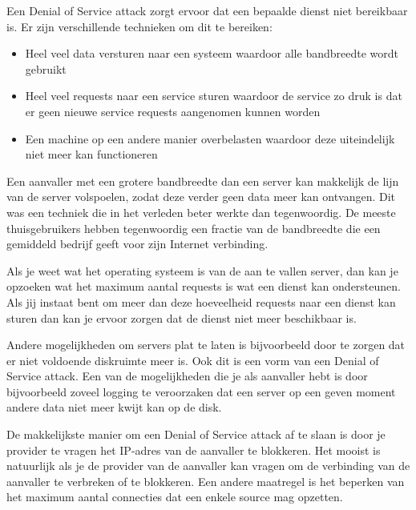 Een Denial of Service attack zorgt ervoor dat een bepaalde dienst niet bereikbaar is. Er zijn verschillende technieken om dit te bereiken:
\begin{itemize}
\item Heel veel data versturen naar een systeem waardoor alle bandbreedte wordt gebruikt
\item Heel veel requests naar een service sturen waardoor de service zo druk is dat er geen nieuwe service requests aangenomen kunnen worden
\item Een machine op een andere manier overbelasten waardoor deze uiteindelijk niet meer kan functioneren
\end{itemize}

Een aanvaller met een grotere bandbreedte dan een server kan makkelijk de lijn van de server volspoelen, zodat deze verder geen data meer kan ontvangen. Dit was een techniek die in het verleden beter werkte dan tegenwoordig. De meeste thuisgebruikers hebben tegenwoordig een fractie van de bandbreedte die een gemiddeld bedrijf geeft voor zijn Internet verbinding.

Als je weet wat het operating systeem is van de aan te vallen server, dan kan je opzoeken wat het maximum aantal requests is wat een dienst kan ondersteunen. Als jij instaat bent om meer dan deze hoeveelheid requests naar een dienst kan sturen dan kan je ervoor zorgen dat de dienst niet meer beschikbaar is.

Andere mogelijkheden om servers plat te laten is bijvoorbeeld door te zorgen dat er niet voldoende diskruimte meer is. Ook dit is een vorm van een Denial of Service attack. Een van de mogelijkheden die je als aanvaller hebt is door bijvoorbeeld zoveel logging te veroorzaken dat een server op een geven moment andere data niet meer kwijt kan op de disk.

De makkelijkste manier om een Denial of Service attack af te slaan is door je provider te vragen het IP-adres van de aanvaller te blokkeren. Het mooist is natuurlijk als je de provider van de aanvaller kan vragen om de verbinding van de aanvaller te verbreken of te blokkeren. Een andere maatregel is het beperken van het maximum aantal connecties dat een enkele source mag opzetten.
